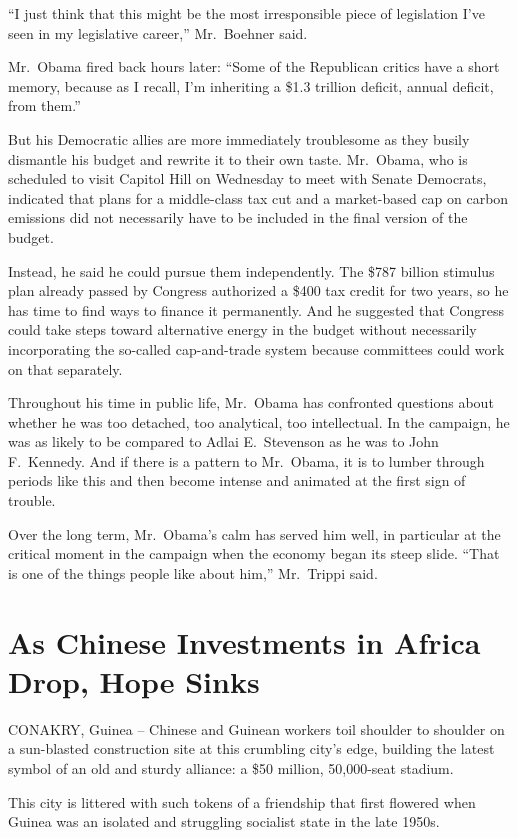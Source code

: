 \documentclass[12pt,a4paper,onecolumn]{article}
\begin{document}
\begin{CJK*}{GBK}{song}
``I just think that this might be the most irresponsible piece of legislation I've seen in my
legislative career,'' Mr.~Boehner said.

Mr.~Obama fired back hours later: ``Some of the Republican critics have a short memory, because as I
recall, I'm inheriting a \$1.3 trillion deficit, annual deficit, from them.''

But his Democratic allies are more immediately troublesome as they busily dismantle his budget and
rewrite it to their own taste. Mr.~Obama, who is scheduled to visit Capitol Hill on Wednesday to
meet with Senate Democrats, indicated that plans for a middle-class tax cut and a market-based cap
on carbon emissions did not necessarily have to be included in the final version of the budget.

Instead, he said he could pursue them independently. The \$787 billion stimulus plan already passed
by Congress authorized a \$400 tax credit for two years, so he has time to find ways to finance it
permanently. And he suggested that Congress could take steps toward alternative energy in the budget
without necessarily incorporating the so-called cap-and-trade system because committees could work
on that separately.

Throughout his time in public life, Mr.~Obama has confronted questions about whether he was too
detached, too analytical, too intellectual. In the campaign, he was as likely to be compared to
Adlai E.~Stevenson as he was to John F.~Kennedy. And if there is a pattern to Mr.~Obama, it is to
lumber through periods like this and then become intense and animated at the first sign of trouble.

Over the long term, Mr.~Obama's calm has served him well, in particular at the critical moment in
the campaign when the economy began its steep slide. ``That is one of the things people like about
him,'' Mr.~Trippi said.

\section{As Chinese Investments in Africa Drop, Hope Sinks}

CONAKRY, Guinea -- Chinese and Guinean workers toil shoulder to shoulder on a sun-blasted
construction site at this crumbling city's edge, building the latest symbol of an old and sturdy
alliance: a \$50 million, 50,000-seat stadium.

This city is littered with such tokens of a friendship that first flowered when Guinea was an
isolated and struggling socialist state in the late 1950s.


\end{CJK*}
\end{document}
